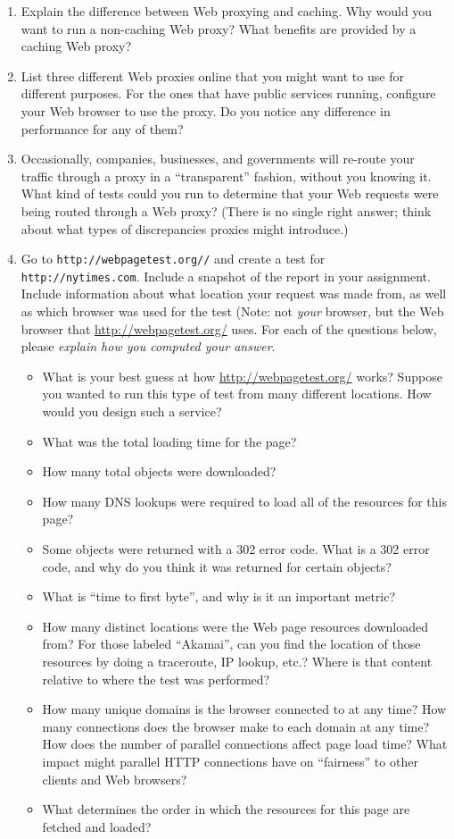 \documentclass[11pt]{article}
\begin{document}
\begin{enumerate}
\item Explain the difference between Web proxying and caching.  Why
  would you want to run a non-caching Web proxy?  What benefits are
  provided by a caching Web proxy?
\item List three different Web proxies online that you might want to use
  for different purposes. For the ones that have public services
  running, configure your Web browser to use the proxy.  Do you notice
  any difference in performance for any of them?
\item Occasionally, companies, businesses, and governments will re-route
  your traffic through a proxy in a ``transparent'' fashion, without you
  knowing it.  What kind of tests could you run to determine that your
  Web requests were being routed through a Web proxy? (There is no
  single right answer; think about what types of discrepancies proxies
  might introduce.)

\item Go to {\tt http://webpagetest.org//} and create a test for {\tt
  http://nytimes.com}.  Include a snapshot of the report in your
  assignment. Include information about what location your request was
  made from, as well as which browser was used for the test (Note: not
  {\em your} browser, but the Web browser that
  \url{http://webpagetest.org/} uses.  For each of the questions below,
  please {\em explain how you computed your answer}.
\begin{itemize}
\item What is your best guess at how \url{http://webpagetest.org/}
  works?  Suppose you wanted to run this type of test from many
  different locations.  How would you design such a service?
\item What was the total loading time for the page?
\item How many total objects were downloaded?
\item How many DNS lookups were required to load all of the resources
  for this page?
\item Some objects were returned with a 302 error code.  What is a 302
  error code, and why do you think it was returned for certain objects?
\item What is ``time to first byte'', and why is it an important metric?
\item How many distinct locations were the Web page resources downloaded
  from?  For those labeled ``Akamai'', can you find the location of
  those resources by doing a traceroute, IP lookup, etc.?  Where is that
  content relative to where the test was performed?
\item How many unique domains is the browser connected to at any time?
  How many connections does the browser make to each domain at any time?
  How does the number of parallel connections affect page load time?
  What impact might parallel HTTP connections have on ``fairness'' to
  other clients and Web browsers?
\item What determines the order in which the resources for this page are
  fetched and loaded?
\end{itemize}


\end{enumerate}
\end{document}
